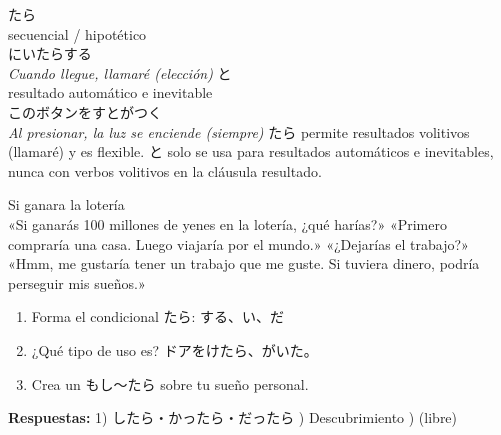   {たら\\\small secuencial / hipotético\\\small {}にいたらする\\\textit{Cuando llegue, llamaré (elección)}}
  {と\\\small resultado automático e inevitable\\\small このボタンをすとがつく\\\textit{Al presionar, la luz se enciende (siempre)}}
  {たら permite resultados volitivos (llamaré) y es flexible. と solo se usa para resultados automáticos e inevitables, nunca con verbos volitivos en la cláusula resultado.}



{Si ganara la lotería\\[0.4em]
  «Si ganarás 100 millones de yenes en la lotería, ¿qué harías?» «Primero compraría una casa. Luego viajaría por el mundo.» «¿Dejarías el trabajo?» «Hmm, me gustaría tener un trabajo que me guste. Si tuviera dinero, podría perseguir mis sueños.»}

\begin{tcolorbox}[ejerciciobox, title={\emoji{pencil} Ejercicios}]
\begin{enumerate}
  \item Forma el condicional たら: する、い、だ
  \item ¿Qué tipo de uso es? ドアをけたら、がいた。
  \item Crea un もし〜たら sobre tu sueño personal.
\end{enumerate}
\textbf{Respuestas:}
1) したら・かったら・だったら ) Descubrimiento ) (libre)
\end{tcolorbox}

